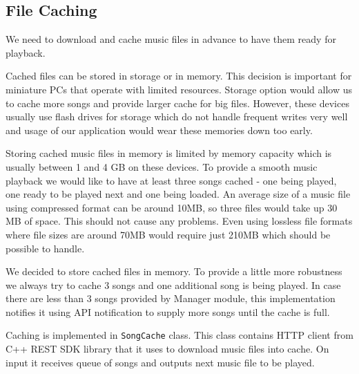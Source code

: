 \subsection{File Caching}

We need to download and cache music files in advance to have them ready for playback. 
\par
Cached files can be stored in storage or in memory. This decision is important for miniature PCs that operate with limited resources. Storage option would allow us to cache more songs and provide larger cache for big files. However, these devices usually use flash drives for storage which do not handle frequent writes very well and usage of our application would wear these memories down too early.
\par
Storing cached music files in memory is limited by memory capacity which is usually between 1 and 4 GB on these devices. To provide a smooth music playback we would like to have at least three songs cached - one being played, one ready to be played next and one being loaded. An average size of a music file using compressed format can be around 10MB, so three files would take up 30 MB of space. This should not cause any problems. Even using lossless file formats where file sizes are around 70MB would require just 210MB which should be possible to handle.
\par
We decided to store cached files in memory. To provide a little more robustness we always try to cache 3 songs and one additional song is being played. In case there are less than 3 songs provided by Manager module, this implementation notifies it using API notification to supply more songs until the cache is full.
\par
Caching is implemented in \texttt{SongCache} class. This class contains HTTP client from C++ REST SDK library that it uses to download music files into cache. On input it receives queue of songs and outputs next music file to be played.


